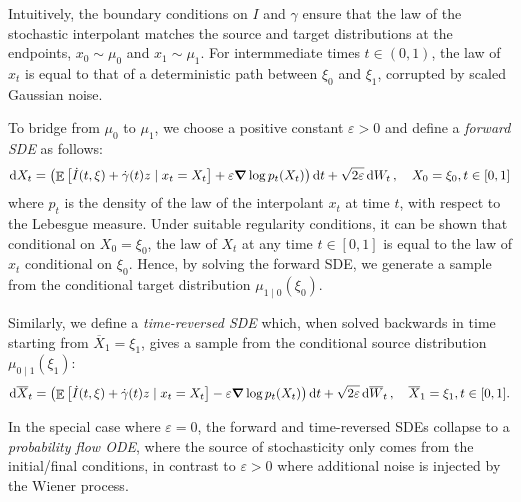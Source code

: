 Intuitively, the boundary conditions on \(I\) and \(\gamma\) ensure that the law of the stochastic interpolant matches the source and target distributions at the endpoints, \(x_{0} \sim \mu_{0}\) and \(x_{1} \sim \mu_{1}\). For intermmediate times \(t \in (0, 1)\), the law of \(x_{t}\) is equal to that of a deterministic path between \(\xi_{0}\) and \(\xi_{1}\), corrupted by scaled Gaussian noise.

To bridge from \(\mu_{0}\) to \(\mu_{1}\), we choose a positive constant \(\varepsilon > 0\) and define a \textit{forward SDE} as follows:
\[
  \dd{X_{t}} = \qty(\mathop{\mathbb{E}}\qty[\dot{I}(t,  \xi) + \dot{\gamma}(t) z \mid x_{t} = X_{t}] + \varepsilon \grad \log p_{t}(X_{t}))\dd{t} + \sqrt{2\varepsilon} \dd{W_{t}}, \quad X_{0} = \xi_{0}, t \in [0, 1]
\]
where \(p_{t}\) is the density of the law of the interpolant \(x_{t}\) at time \(t\), with respect to the Lebesgue measure. Under suitable regularity conditions, it can be shown that conditional on \(X_{0} = \xi_{0}\), the law of \(X_{t}\) at any time \(t \in [0, 1]\) is equal to the law of \(x_{t}\) conditional on \(\xi_{0}\). Hence, by solving the forward SDE, we generate a sample from the conditional target distribution \(\mu_{1 \mid 0}(\xi_{0})\). %

Similarly, we define a \textit{time-reversed SDE} which, when solved backwards in time starting from \(\overline{X}_{1} = \xi_{1}\), gives a sample from the conditional source distribution \(\mu_{0 \mid 1}(\xi_{1})\):
\[
  \dd{ \overline{X}_{t}} = \qty(\mathop{\mathbb{E}}\qty[ \dot{I}(t, \xi) + \dot{\gamma}(t) z \mid x_{t} = X_{t}] - \varepsilon \grad \log p_{t}(X_{t}))\dd{t} + \sqrt{2\varepsilon} \dd{ \overline{W}_{t}}, \quad \overline{X}_{1} = \xi_{1}, t \in [0, 1].
\]

In the special case where \(\varepsilon = 0\), the forward and time-reversed SDEs collapse to a \textit{probability flow ODE}, where the source of stochasticity only comes from the initial/final conditions, in contrast to \(\varepsilon > 0\) where additional noise is injected by the Wiener process. %





